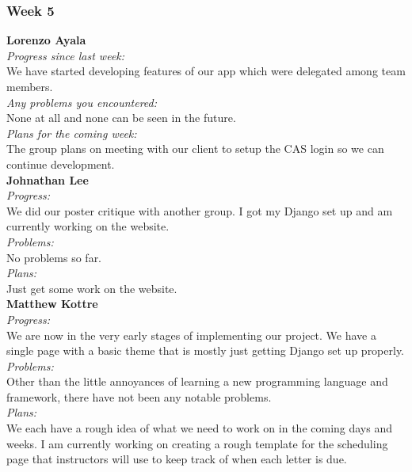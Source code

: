 \subsubsection{Week 5}

\textbf{Lorenzo Ayala}\\
\noindent\textit{Progress since last week:}\\
We have started developing features of our app  which were delegated among team members.\\

\noindent\textit{Any problems you encountered:}\\
\noindent None at all and none can be seen in the future.\\

\noindent\textit{Plans for the coming week:}\\
\noindent The group plans on meeting with our client to setup the CAS login so we can continue development.\\

\noindent\textbf{Johnathan Lee}\\
\noindent\textit{Progress:}\\
We did our poster critique with another group. I got my Django set up and am currently working on the website. \\ 

\noindent\textit{Problems:}\\
\noindent No problems so far.\\

\noindent\textit{Plans:}\\
\noindent Just get some work on the website.\\

\noindent\textbf{Matthew Kottre}\\
\noindent\textit{Progress:}\\
We are now in the very early stages of implementing our project. We have a single page with a basic theme that is mostly just getting Django set up properly.\\

\noindent\textit{Problems:}\\
\noindent Other than the little annoyances of learning a new programming language and framework, there have not been any notable problems.\\

\noindent\textit{Plans:}\\
\noindent We each have a rough idea of what we need to work on in the coming days and weeks. I am currently working on creating a rough template for the scheduling page that instructors will use to keep track of when each letter is due.\\

